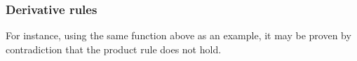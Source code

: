 \documentclass{article}
\DeclareMathOperator{\di}{\,d\!}
\begin{document}
%

\subsubsection{Derivative rules}

For instance, using the same function above as an example, it may be proven by
contradiction that the product rule does not hold.
\end{document}
